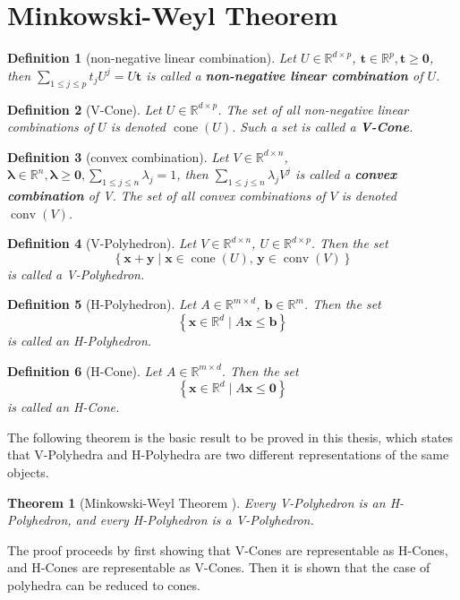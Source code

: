 \documentclass[fleqn]{article}
\renewcommand{\vec}[1]{\mathbf{#1}}
\newcommand{\set}[1]{\left\{#1\right\}}
\DeclareMathOperator{\cone}{cone}
\DeclareMathOperator{\conv}{conv}
\newcommand{\R}{\mathbb{R}}
\newcommand{\0}{\vec{0}}
\newcommand{\x}{\vec{x}}
\newcommand{\y}{\vec{y}}
\renewcommand{\t}{\vec{t}}
\renewcommand{\b}{\vec{b}}
\newcommand{\st}{\;|\;}
\newcommand{\St}{\;\Big|\;}
\newcommand{\Udim}{p}
\newcommand{\Vdim}{n}
\newcommand{\Adim}{m}
\newcommand{\mspaceA}{\R^{{\Adim}\times d}}
\newcommand{\bv}{\b \in \R^{\Adim}}
\newcommand{\tv}{\t \in \R^{\Udim}}
\renewcommand{\l}{\bm{\lambda}}
\newcommand{\lv}{\l \in \R^{\Vdim}}
\newcommand{\xv}{\x \in \R^d}
\newcommand{\mV}{V \in \R^{d\times \Vdim}}
\newcommand{\mU}{U \in \R^{d\times \Udim}}
\newcommand{\mA}{A \in \mspaceA}
\newcommand{\tusum}{\sum_{1\leq j \leq \Udim}t_j U^j}
\newcommand{\lvsum}{\sum_{1\leq j \leq \Vdim}\lambda_j V^j}
\newcommand{\lsum}{\sum_{1\leq j \leq \Vdim}\lambda_j}
\newcommand{\isconv}{\lambda_j \geq 0 \lsum = 1}
\newtheorem{Def}{Definition}
\newtheorem{Thm}{Theorem}
\newcommand{\MWT}{Minkowski-Weyl Theorem }
\begin{document}
\section{\MWT}

\begin{Def}[non-negative linear combination]{
  Let $\mU$, $\tv, \t \geq \0$, then \( \tusum = U\t\) is called a \textbf{non-negative linear combination} of $U$.
}\end{Def}

\begin{Def}[V-Cone]{
  Let $\mU$.  The set of all non-negative linear combinations of $U$ is denoted $\cone(U)$.  Such a set is called a \textbf{V-Cone}.
}\end{Def} 

\begin{Def}[convex combination]{
  Let $\mV$, $\lv, \l \geq\0, \lsum = 1$, then \( \lvsum \) is called a \textbf{convex combination} of V.  The set of all convex combinations of $V$ is denoted $\conv(V)$.
}\end{Def}

\begin{Def}[V-Polyhedron]{
  Let $\mV$, $\mU$.  Then the set
  \[ \set{\x + \y \st \x \in \cone(U),\, \y \in \conv(V)} \]
  is called a \em{V-Polyhedron}.
}\end{Def}

\begin{Def}[H-Polyhedron]{
  Let $\mA$, $\bv$.  Then the set
  \[ \set{\xv \St A\x \leq \b} \]
  is called an \em{H-Polyhedron}.
}\end{Def}

\begin{Def}[H-Cone]{
  Let $\mA$. Then the set
  \[ \set{\xv \St A\x \leq \0} \]
  is called an \em{H-Cone}.
}\end{Def}

The following theorem is the basic result to be proved in this thesis, which states that V-Polyhedra and H-Polyhedra are two different representations of the same objects.

\begin{Thm}[\MWT]{
  Every V-Polyhedron is an H-Polyhedron, and every H-Polyhedron is a V-Polyhedron.
}\end{Thm}

The proof proceeds by first showing that V-Cones are representable as H-Cones, and H-Cones are representable as V-Cones.  Then it is shown that the case of polyhedra can be reduced to cones.
\end{document}
